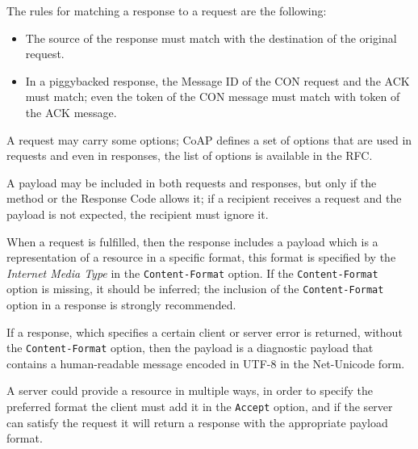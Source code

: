 	The rules for matching a response to a request are the following:
	\begin{itemize}
		\item The source of the response must match with the destination of the original request.
		\item In a piggybacked response, the Message ID of the CON request and the ACK must match; even the token of the CON message must match with token of the ACK message.
	\end{itemize}
	A request may carry some options; CoAP defines a set of options that are used in requests and even in responses,
	the list of options is available in the RFC.
	
	A payload may be included in both requests and responses, but only if the method or the Response Code allows it; if a recipient receives a request and the payload is not expected, the recipient must ignore it.
	
	When a request is fulfilled, then the response includes a payload which is a representation of a resource in a specific format, this format is specified by the \emph{Internet Media Type} in the \texttt{Content-Format} option.\newline
	If the \texttt{Content-Format} option is missing, it should be inferred; the inclusion of the \texttt{Content-Format} option in a response is strongly recommended.\newline
	
	If a response, which specifies a certain client or server error is returned, without the \texttt{Content-Format} option, then the payload is a diagnostic payload that contains a human-readable message encoded in UTF-8 in the Net-Unicode form.\newline
	
	A server could provide a resource in multiple ways, in order to specify the preferred format the client must add it in the \texttt{Accept} option, and if the server can satisfy the request it will return a response with the appropriate payload format.\newline
	
